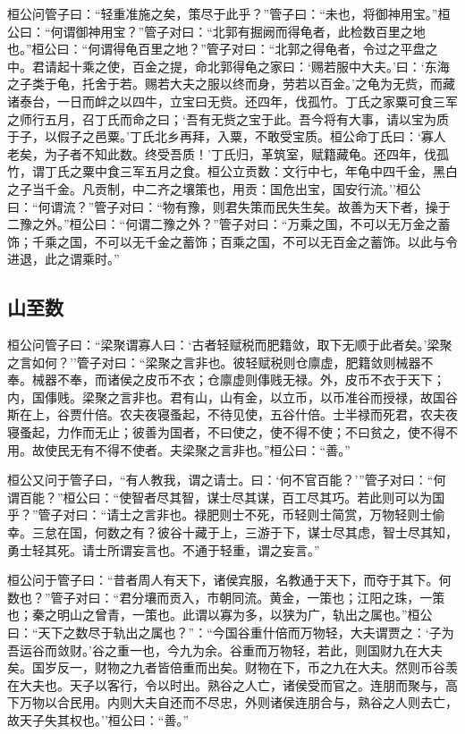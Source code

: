 \documentclass[]{article}
\begin{document}
桓公问管子曰：``轻重准施之矣，策尽于此乎？''管子曰：``未也，将御神用宝。''桓公曰：``何谓御神用宝？''管子对曰：``北郭有掘阙而得龟者，此检数百里之地也。''桓公曰：``何谓得龟百里之地？''管子对曰：``北郭之得龟者，令过之平盘之中。君请起十乘之使，百金之提，命北郭得龟之家曰：`赐若服中大夫。'曰：`东海之子类于龟，托舍于若。赐若大夫之服以终而身，劳若以百金。'之龟为无赀，而藏诸泰台，一日而衅之以四牛，立宝曰无赀。还四年，伐孤竹。丁氏之家粟可食三军之师行五月，召丁氏而命之曰；`吾有无赀之宝于此。吾今将有大事，请以宝为质于子，以假子之邑粟。'丁氏北乡再拜，入粟，不敢受宝质。桓公命丁氏曰：`寡人老矣，为子者不知此数。终受吾质！'丁氏归，革筑室，赋籍藏龟。还四年，伐孤竹，谓丁氏之粟中食三军五月之食。桓公立贡数：文行中七，年龟中四千金，黑白之子当千金。凡贡制，中二齐之壤策也，用贡：国危出宝，国安行流。''桓公曰：``何谓流？''管子对曰：``物有豫，则君失策而民失生矣。故善为天下者，操于二豫之外。''桓公曰：``何谓二豫之外？''管子对曰：``万乘之国，不可以无万金之蓄饰；千乘之国，不可以无千金之蓄饰；百乘之国，不可以无百金之蓄饰。以此与令进退，此之谓乘时。''

\hypertarget{header-n1007}{%
\subsection{山至数}\label{header-n1007}}

桓公问管子曰：``梁聚谓寡人曰：`古者轻赋税而肥籍敛，取下无顺于此者矣。'梁聚之言如何？''管子对曰：``梁聚之言非也。彼轻赋税则仓廪虚，肥籍敛则械器不奉。械器不奉，而诸侯之皮币不衣；仓廪虚则倳贱无禄。外，皮币不衣于天下；内，国倳贱。梁聚之言非也。君有山，山有金，以立币，以币准谷而授禄，故国谷斯在上，谷贾什倍。农夫夜寝蚤起，不待见使，五谷什倍。士半禄而死君，农夫夜寝蚤起，力作而无止；彼善为国者，不曰使之，使不得不使；不曰贫之，使不得不用。故使民无有不得不使者。夫梁聚之言非也。''桓公曰：``善。''

桓公又问于管子曰，``有人教我，谓之请士。曰：`何不官百能？'''管子对曰：``何谓百能？''桓公曰：``使智者尽其智，谋士尽其谋，百工尽其巧。若此则可以为国乎？''管子对曰：``请士之言非也。禄肥则士不死，币轻则士简赏，万物轻则士偷幸。三怠在国，何数之有？彼谷十藏于上，三游于下，谋士尽其虑，智士尽其知，勇士轻其死。请士所谓妄言也。不通于轻重，谓之妄言。''

桓公问于管子曰：``昔者周人有天下，诸侯宾服，名教通于天下，而夺于其下。何数也？''管子对曰：``君分壤而贡入，市朝同流。黄金，一策也；江阳之珠，一策也；秦之明山之曾青，一策也。此谓以寡为多，以狭为广，轨出之属也。''桓公曰：``天下之数尽于轨出之属也？''：``今国谷重什倍而万物轻，大夫谓贾之：`子为吾运谷而敛财。'谷之重一也，今九为余。谷重而万物轻，若此，则国财九在大夫矣。国岁反一，财物之九者皆倍重而出矣。财物在下，币之九在大夫。然则币谷羡在大夫也。天子以客行，令以时出。熟谷之人亡，诸侯受而官之。连朋而聚与，高下万物以合民用。内则大夫自还而不尽忠，外则诸侯连朋合与，熟谷之人则去亡，故天子失其权也。''桓公曰：``善。''
\end{document}

